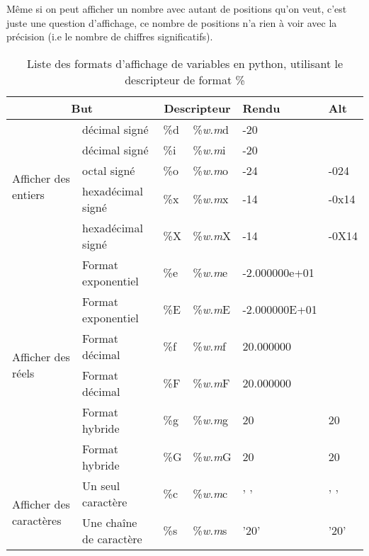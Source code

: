 \documentclass[a4paper,twoside]{article}
\begin{document}
Même si on peut afficher un nombre avec autant de positions qu'on veut, c'est juste une question d'affichage, ce nombre de positions n'a rien à voir avec la précision (i.e le nombre de chiffres significatifs). 
\begin{table}
\begin{center}
\begin{tabular}{|p{2cm}|l||l|l|l|l|}
\hline
\multicolumn{2}{|c||}{But} & \multicolumn{2}{c|}{Descripteur} & Rendu & Alt\\\hline
\multirow{5}{2cm}{Afficher des entiers} & décimal signé & \%d & \%\emph{w}.\emph{m}d & -20 &\\\cline{2-6}
 & décimal signé & \%i & \%\emph{w}.\emph{m}i & -20 &\\\cline{2-6}
 & octal signé & \%o & \%\emph{w}.\emph{m}o & -24 & -024\\\cline{2-6}
 & hexadécimal signé & \%x & \%\emph{w}.\emph{m}x & -14 & -0x14\\\cline{2-6}
 & hexadécimal signé & \%X & \%\emph{w}.\emph{m}X & -14 & -0X14\\\hline
\multirow{6}{2cm}{Afficher des réels} & Format exponentiel & \%e & \%\emph{w}.\emph{m}e & -2.000000e+01 & \footnotemark[103]\\\cline{2-6}
 & Format exponentiel & \%E & \%\emph{w}.\emph{m}E & -2.000000E+01 & \footnotemark[103]\\\cline{2-6}
 & Format décimal & \%f & \%\emph{w}.\emph{m}f & 20.000000 & \footnotemark[103]\\\cline{2-6}
 & Format décimal & \%F & \%\emph{w}.\emph{m}F & 20.000000 & \footnotemark[103]\\\cline{2-6}
 & Format hybride \footnotemark[101] & \%g & \%\emph{w}.\emph{m}g & 20 & 20\footnotemark[104]\\\cline{2-6}
 & Format hybride \footnotemark[101] & \%G & \%\emph{w}.\emph{m}G & 20 & 20\footnotemark[104]\\\hline
\multirow{2}{2cm}{Afficher des caractères} & Un seul caractère \footnotemark[102] & \%c & \%\emph{w}.\emph{m}c & ' ' & ' '\\\cline{2-6}
 & Une chaîne de caractère & \%s & \%\emph{w}.\emph{m}s & '20' & '20'\\\hline
\end{tabular}
\end{center}
\caption{Liste des formats d'affichage de variables en python, utilisant le descripteur de format \%}\label{tab:formats}
\end{table}
\end{document}
